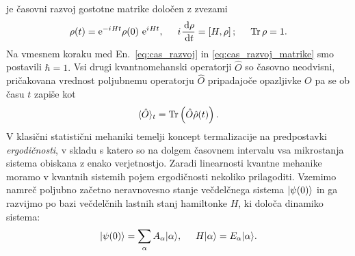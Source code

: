  je časovni razvoj gostotne matrike določen z zvezami 	
\begin{equation}\label{eq:cas_razvoj_matrike}
\rho(t)=\mathrm{e}^{-{i\mkern1mu} H t}\rho(0)\ \mathrm{e}^{{i\mkern1mu} H t}, \hspace{5mm} {i\mkern1mu}\frac{\,\mathrm{d} \rho}{\,\mathrm{d} t}=\left[H, \rho\right]; \hspace{5mm} \mathop{\rm Tr}{\rho}=1.
\end{equation}
Na vmesnem koraku med En.~\eqref{eq:cas_razvoj} in \eqref{eq:cas_razvoj_matrike} smo postavili $\hbar=1.$ Vsi drugi kvantnomehanski operatorji $\hat{O}$ so časovno neodvisni, pričakovana vrednost poljubnemu operatorju $\hat{O}$ pripadajoče opazljivke $O$ pa se ob času $t$ zapiše kot 
\begin{equation}
\langle \hat{O}\rangle_t = \mathop{\rm Tr}\left(\hat{O}\hat{\rho}(t)\right).
\end{equation}
V klasični statistični mehaniki temelji koncept termalizacije na predpostavki \emph{ergodičnosti}, v skladu s katero so na dolgem časovnem intervalu vsa mikrostanja sistema obiskana z enako verjetnostjo. Zaradi linearnosti kvantne mehanike moramo v kvantnih sistemih pojem ergodičnosti nekoliko prilagoditi. Vzemimo namreč poljubno začetno neravnovesno stanje večdelčnega sistema $\vert\psi(0)\rangle$ in ga razvijmo po bazi večdelčnih lastnih stanj hamiltonke $H$, ki določa dinamiko sistema:
\begin{equation}\label{eq:lastna_stanja}
\vert\psi(0)\rangle=\sum\limits_\alpha A_\alpha \vert\alpha\rangle, \hspace{5mm} H\vert\alpha\rangle=E_\alpha\vert\alpha\rangle.
\end{equation}
